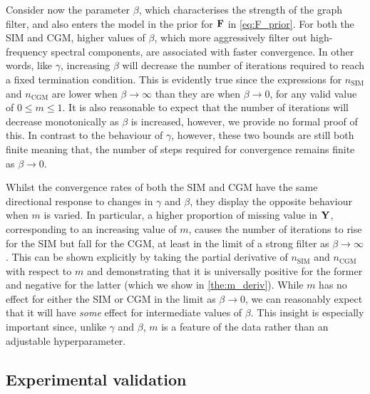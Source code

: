 Consider now the parameter $\beta$, which characterises the strength of the graph filter, and also enters the model in the prior for $\mathbf{F}$ in \cref{eq:F_prior}. For both the SIM and CGM, higher values of $\beta$, which more aggressively filter out high-frequency spectral components, are associated with faster convergence. In other words, like $\gamma$, increasing $\beta$ will decrease the number of iterations required to reach a fixed termination condition. This is evidently true since the expressions for $n_\text{SIM}$ and $n_\text{CGM}$ are lower when $\beta \rightarrow \infty$ than they are when $\beta \rightarrow 0$, for any valid value of $0 \leq m \leq 1$. It is also reasonable to expect that the number of iterations will decrease monotonically as $\beta$ is increased, however, we provide no formal proof of this. In contrast to the behaviour of $\gamma$, however, these two bounds are still both finite meaning that, the number of steps required for convergence remains finite as $\beta \rightarrow 0$. 

Whilst the convergence rates of both the SIM and CGM have the same directional response to changes in $\gamma$ and $\beta$, they display the opposite behaviour when $m$ is varied. In particular, a higher proportion of missing value in $\mathbf{Y}$, corresponding to an increasing value of $m$, causes the number of iterations to rise for the SIM but fall for the CGM, at least in the limit of a strong filter as $\beta \rightarrow \infty$. This can be shown explicitly by taking the partial derivative of $n_\text{SIM}$ and $n_\text{CGM}$ with respect to $m$ and demonstrating that it is universally positive for the former and negative for the latter (which we show in \cref{the:m_deriv}). While $m$ has no effect for either the SIM or CGM in the limit as $\beta \rightarrow 0$, we can reasonably expect that it will have \textit{some} effect for intermediate values of $\beta$. This insight is especially important since, unlike $\gamma$ and $\beta$, $m$ is a feature of the data rather than an adjustable hyperparameter. 

\subsection{Experimental validation}

